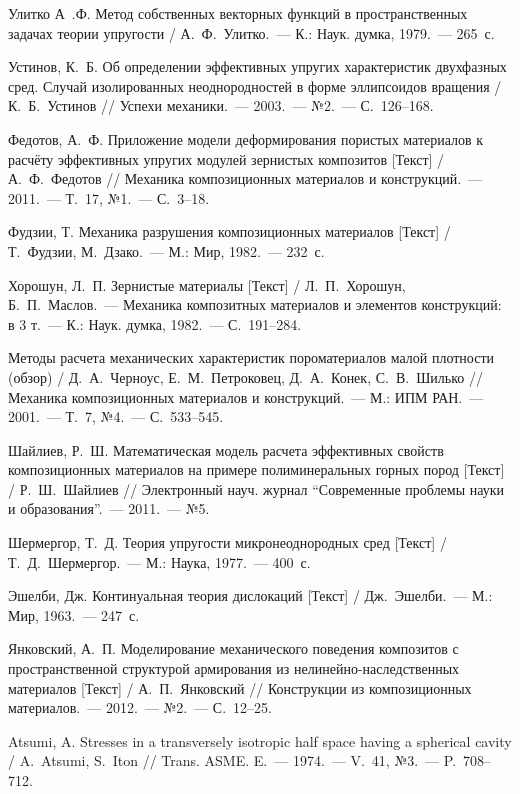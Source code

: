 \begin{biblist}{99}
Улитко А~.Ф. 
Метод собственных векторных функций в пространственных задачах теории упругости 
/ А.~Ф.~Улитко.~--- К.: Наук. думка, 1979.~--- 265~с.

Устинов, К.~Б. 
Об определении эффективных упругих характеристик двухфазных сред. Случай изолированных неоднородностей в форме эллипсоидов вращения  
/ К.~Б.~Устинов 
// Успехи механики.~--- 2003.~--- №2.~--- С.~126--168.

Федотов, А.~Ф. 
Приложение модели деформирования пористых материалов к расчёту эффективных упругих модулей зернистых композитов [Текст] 
/ А.~Ф.~Федотов 
// Механика композиционных материалов и конструкций.~--- 2011.~--- Т.~17, №1.~--- С.~3--18.

Фудзии, Т. 
Механика разрушения композиционных материалов [Текст] 
/ Т.~Фудзии, М.~Дзако.~--- М.: Мир, 1982.~--- 232~с.

Хорошун, Л.~П. 
Зернистые материалы [Текст] 
/ Л.~П.~Хорошун, Б.~П.~Маслов.~--- Механика композитных материалов и элементов конструкций: в 3 т.~--- К.: Наук. думка, 1982.~--- С.~191--284.

Методы расчета механических характеристик пороматериалов малой плотности (обзор) 
/ Д.~А.~Черноус, Е.~М.~Петроковец, Д.~А.~Конек, С.~В.~Шилько 
// Механика композиционных материалов и конструкций.~--- М.: ИПМ РАН.~--- 2001.~--- Т.~7, №4.~--- С.~533--545.

Шайлиев, Р.~Ш. 
Математическая модель расчета эффективных свойств композиционных материалов на примере полиминеральных горных пород [Текст] 
/ Р.~Ш.~Шайлиев 
// Электронный науч. журнал ``Современные проблемы науки и образования''.~--- 2011.~--- №5.

Шермергор, Т.~Д. 
Теория упругости микронеоднородных сред [Текст] 
/ Т.~Д.~Шермергор.~--- М.: Наука, 1977.~--- 400~с.

Эшелби, Дж. 
Континуальная теория дислокаций [Текст] 
/ Дж.~Эшелби.~--- М.: Мир, 1963.~--- 247~с.

Янковский, А.~П. 
Моделирование механического поведения композитов с пространственной структурой армирования из нелинейно-наследственных материалов [Текст] 
/ А.~П.~Янковский 
// Конструкции из композиционных материалов.~--- 2012.~--- №2.~--- С.~12--25.

Atsumi, A. 
Stresses in a transversely isotropic half space having a spherical cavity 
/ A.~Atsumi, S.~Iton 
// Trans. ASME. E.~--- 1974.~--- V.~41, №3.~--- P.~708--712.


\end{biblist}
